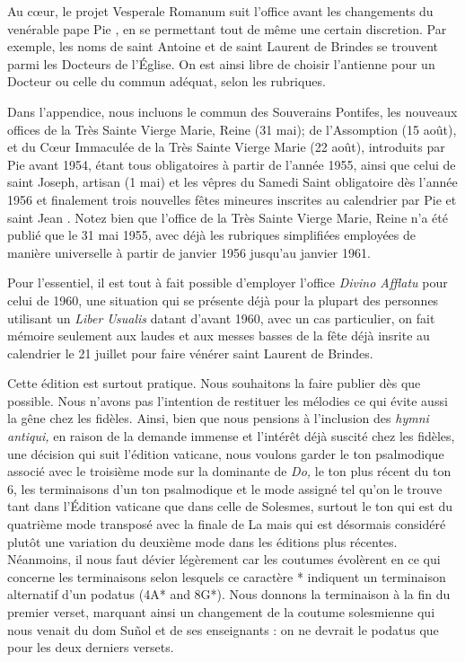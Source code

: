 \begin{frpars}
Au cœur, le projet Vesperale Romanum suit l'office avant les changements du venérable pape Pie , en se permettant tout de même une certain discretion. Par exemple, les noms de saint Antoine et de saint Laurent de Brindes se trouvent parmi les Docteurs de l'Église. On est ainsi libre de choisir l'antienne pour un Docteur ou celle du commun adéquat, selon les rubriques.

Dans l'appendice, nous incluons le commun des Souverains Pontifes, les nouveaux offices de la Très Sainte Vierge Marie, Reine (31 mai); de l'Assomption (15 août), et du Cœur Immaculée de la Très Sainte Vierge Marie (22 août), introduits par Pie  avant 1954, étant tous obligatoires à partir de l'année 1955, ainsi que celui de saint Joseph, artisan (1 mai) et les vêpres du Samedi Saint obligatoire dès l'année 1956 et finalement trois nouvelles fêtes mineures inscrites au calendrier par Pie  et saint Jean . Notez bien que l'office de la Très Sainte Vierge Marie, Reine n'a été publié que le 31 mai 1955, avec déjà les rubriques simplifiées employées de manière universelle à partir de janvier 1956 jusqu'au janvier 1961.

Pour l'essentiel, il est tout à fait possible d'employer l'office \textit{Divino Afflatu} pour celui de 1960, une situation qui se présente déjà pour la plupart des personnes utilisant un \textit{Liber Usualis} datant d'avant 1960, avec un cas particulier, on fait mémoire seulement aux laudes et aux messes basses de la fête déjà insrite au calendrier le 21 juillet pour faire vénérer saint Laurent de Brindes.

Cette édition est surtout pratique. Nous souhaitons la faire publier dès que possible. Nous n'avons pas l'intention de restituer les mélodies ce qui évite aussi la gêne chez les fidèles. Ainsi, bien que nous pensions à l'inclusion des \textit{hymni antiqui,} en raison de la demande immense et l'intérêt déjà suscité chez les fidèles, une décision qui suit l'édition vaticane, nous voulons garder le ton psalmodique associé avec le troisième mode sur la dominante de \textit{Do,} le ton plus récent du ton 6, les terminaisons d'un ton psalmodique et le mode assigné tel qu'on le trouve tant dans l'Édition vaticane que dans celle de Solesmes, surtout le ton qui est du quatrième mode transposé avec la finale de La mais qui est désormais considéré plutôt une variation du deuxième mode dans les éditions plus récentes. Néanmoins, il nous faut dévier légèrement car les coutumes évolèrent en ce qui concerne les terminaisons selon lesquels ce caractère * indiquent un terminaison alternatif d'un podatus  (4A* and 8G*). Nous donnons la terminaison à la fin du premier verset, marquant ainsi un changement de la coutume solesmienne qui nous venait du dom Suñol et de ses enseignants : on ne devrait le podatus que pour les deux derniers versets.


\end{frpars}
